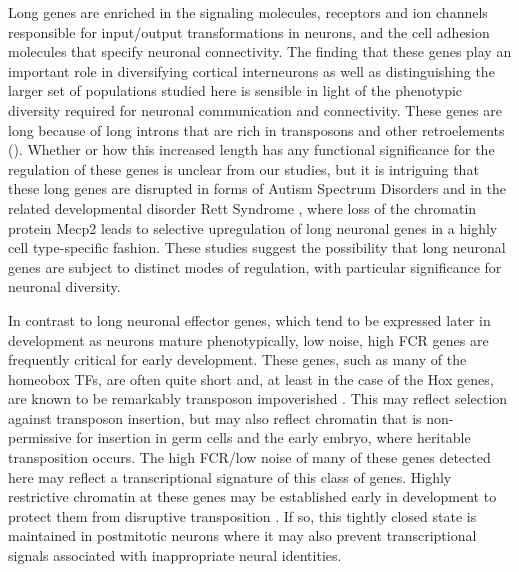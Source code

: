 Long genes are enriched in the signaling molecules, receptors and ion channels responsible for input/output transformations in neurons, and the cell adhesion molecules that specify neuronal connectivity. The finding that these genes play an important role in diversifying cortical interneurons \cite{Paul_2017} as well as distinguishing the larger set of populations studied here is sensible in light of the phenotypic diversity required for neuronal communication and connectivity. These genes are long because of long introns that are rich in transposons and other retroelements (). Whether or how this increased length has any functional significance for the regulation of these genes is unclear from our studies, but it is intriguing that these long genes are disrupted in forms of Autism Spectrum Disorders \citep{Zylka_2015,Wei_2016} and in the related developmental disorder Rett Syndrome \citep{Sugino_2014,Gabel_2015}, where loss of the chromatin protein Mecp2 leads to selective upregulation of long neuronal genes in a highly cell type-specific fashion. These studies suggest the possibility that long neuronal genes are subject to distinct modes of regulation, with particular significance for neuronal diversity.   

In contrast to long neuronal effector genes, which tend to be expressed later in development as neurons mature phenotypically, low noise, high FCR genes are frequently critical for early development. These genes, such as many of the homeobox TFs, are often quite short and, at least in the case of the Hox genes, are known to be remarkably transposon impoverished \citep{Chinwalla_2002,Simons_2005}. This may reflect selection against transposon insertion, but may also reflect chromatin that is non-permissive for insertion in germ cells and the early embryo, where heritable transposition occurs. The high FCR/low noise of many of these genes detected here may reflect a transcriptional signature of this class of genes. Highly restrictive chromatin at these genes may be established early in development to protect them from disruptive transposition \citep{Montavon_2014}. If so, this tightly closed state is maintained in postmitotic neurons where it may also prevent transcriptional signals associated with inappropriate neural identities. 

